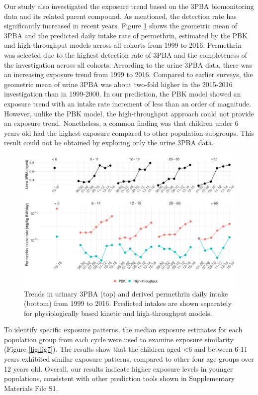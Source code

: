 \documentclass[toxics,article,submit,pdftex,moreauthors]{Definitions/mdpi}
\begin{document}
Our study also investigated the exposure trend based on the 3PBA
biomonitoring data and its related parent compound. As mentioned, the
detection rate has significantly increased in recent years. Figure
\ref{fig:fig6} shows the geometric mean of 3PBA and the predicted daily
intake rate of permethrin, estimated by the PBK and high-throughput
models across all cohorts from 1999 to 2016. Permethrin was selected due
to the highest detection rate of 3PBA and the completeness of the
investigation across all cohorts. According to the urine 3PBA data,
there was an increasing exposure trend from 1999 to 2016. Compared to
earlier surveys, the geometric mean of urine 3PBA was about two-fold
higher in the 2015-2016 investigation than in 1999-2000. In our
prediction, the PBK model showed an exposure trend with an intake rate
increment of less than an order of magnitude. However, unlike the PBK
model, the high-throughput approach could not provide an exposure trend.
Nonetheless, a common finding was that children under 6 years old had
the highest exposure compared to other population subgroups. This result
could not be obtained by exploring only the urine 3PBA data.

\begin{figure}[H]
\centering
\begin{adjustwidth}{-2cm}{}
\centering
\includegraphics[width=\linewidth]{figures/fig6}
\hfill
\end{adjustwidth}
\caption{Trends in urinary 3PBA (top) and derived permethrin daily intake (bottom) from 1999
to 2016. Predicted intakes are shown separately for physiologically based
kinetic and high-throughput models.\label{fig:fig6}}
\end{figure}

To identify specific exposure patterns, the median exposure estimates
for each population group from each cycle were used to examine exposure
similarity (Figure \ref{fig:fig7}). The results show that the children
aged \textless6 and between 6-11 years exhibited similar exposure
patterns, compared to other four age groups over 12 years old. Overall,
our results indicate higher exposure levels in younger populations,
consistent with other prediction tools shown in Supplementary Materials
File S1.
\end{document}

